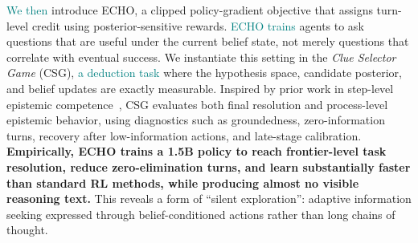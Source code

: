 \documentclass[11pt]{article}
\newcommand{\nk}[1]{\textcolor{teal}{#1}}
\theoremstyle{plain}
\theoremstyle{definition}
\theoremstyle{remark}
\begin{document}

 
\nk{We then} introduce \textsc{ECHO}, a clipped policy-gradient objective that assigns turn-level credit using posterior-sensitive rewards. \nk{\textsc{ECHO} trains} agents to ask questions that are useful under the current belief state, not merely questions that correlate with eventual success. We instantiate this setting in the \emph{Clue Selector Game} (CSG), \nk{a deduction task} where 
the hypothesis space, candidate posterior, and belief updates are exactly measurable. Inspired by prior work in step-level epistemic competence~\citep{shao2025llm}, CSG evaluates both final resolution and process-level epistemic behavior, using diagnostics 
such as groundedness, zero-information turns, recovery after low-information actions, and late-stage calibration. \textbf{Empirically, \textsc{ECHO} trains a 1.5B policy to reach frontier-level task resolution, reduce zero-elimination turns, and learn substantially faster than standard RL methods, while producing almost no visible reasoning text.} This reveals a form of ``silent exploration'': adaptive information seeking expressed through belief-conditioned actions rather than long chains of thought.
\end{document}
